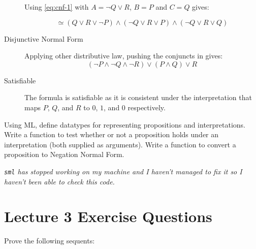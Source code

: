 \documentclass{supervision}
\begin{document}
\begin{questions}
\begin{parts}
\begin{solution}
\begin{description}
                Using \eqref{eq:cnf-1} with $A = \lnot Q \lor R $, $B = P$ and
                $C = Q$ gives:

                \begin{equation*}
                    \simeq (Q \lor R \lor \lnot P) \land
                    (\lnot Q \lor R \lor P) \land (\lnot Q \lor R \lor Q)
                \end{equation*}


              \item[Disjunctive Normal Form]
                Applying other distributive law, pushing the conjuncts in
                gives:
                \begin{equation*}
                  (\lnot P \land \lnot Q \land \lnot R) \lor (P \land Q) \lor R
                \end{equation*}


              \item[Satisfiable] The formula is satisfiable as it is consistent
                under the interpretation that maps $P$, $Q$, and $R$ to $0$, $1$,
                and $0$ respectively.

            \end{description}
          \end{solution}
      \end{parts}
    \question Using ML, define datatypes for representing propositions and
      interpretations. Write a function to test whether or not a proposition
      holds under an interpretation (both supplied as arguments). Write a
      function to convert a proposition to Negation Normal Form.
      \begin{solution}
        \emph{\lstinline|sml| has stopped working on my machine and I haven't managed to fix it so I haven't been able to check this code.}
      \end{solution}


    \section*{Lecture 3 Exercise Questions}
    \question Prove the following sequents:
\end{questions}
\end{document}
